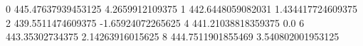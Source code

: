 0 445.47637939453125 4.2659912109375
1 442.6448059082031 1.434417724609375
2 439.5511474609375 -1.65924072265625
4 441.21038818359375 0.0
6 443.35302734375 2.14263916015625
8 444.7511901855469 3.540802001953125
